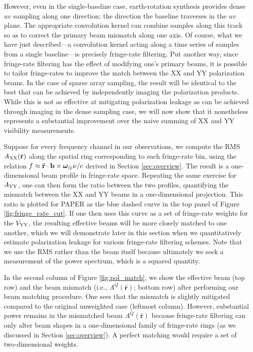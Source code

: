 \documentclass[twocolumn,apj,numberedappendix]{emulateapj}
\newcommand{\rhat}{\hat{\mathbf{r}}}
\begin{document}
However, even in the single-baseline case, earth-rotation synthesis provides dense $uv$ sampling along one direction: the
direction the baseline traverses in the $uv$ plane.  The appropriate
convolution kernel can combine samples along this track so as to correct the primary beam mismatch along one axis.
Of course, what we have just described---a convolution kernel acting along a time series
of samples from a single baseline---is precisely fringe-rate filtering.  Put another way, since fringe-rate filtering has the effect of modifying one's primary beams, it is possible to tailor fringe-rates to improve the match between the XX and YY polarization beams. In the case of sparse array sampling, the result will be identical to the best that can be achieved by independently
imaging the polarization products.  While this is not as effective at mitigating polarization leakage as can be achieved
through imaging in the dense sampling case, we will now show that it nonetheless represents a substantial improvement
over the naive summing of XX and YY visibility measurements.

Suppose for every frequency channel in our observations, we compute the RMS $A_{\rm XX} (\rhat)$ along
the spatial ring corresponding to each fringe-rate bin, using the relation $f \approx \rhat \cdot \mathbf{b}
\times \boldsymbol \omega_\Earth \nu / c$ derived in Section \ref{sec:overview}. The result is
a one-dimensional beam profile in fringe-rate space. Repeating the same exercise for $A_{\rm YY}$,
one can then form the ratio between the two profiles, quantifying the mismatch between the XX and YY
beams in a one-dimensional projection. This ratio is plotted for PAPER as the blue dashed curve in the
top panel of Figure \ref{fig:fringe_rate_cut}. If one then uses this curve as a set of fringe-rate weights
for the ${V_{\rm YY}}$, the resulting effective beams will be more closely matched to one another, which we
will demonstrate later in this section when we quantitatively estimate polarization leakage for various fringe-rate filtering
schemes. Note that
we use the RMS rather than the beam itself because ultimately we seek a measurement
of the power spectrum, which is a squared quantity.

In the second column of Figure \ref{fig:pol_match}, we show the effective beam (top row) and the beam
mismatch (i.e., $A^Q (\rhat)$; bottom row) after performing our beam matching procedure. One sees
that the mismatch is slightly mitigated compared to the original unweighted case (leftmost column).
However, substantial power remains in the mismatched beam $A^Q (\rhat)$ because fringe-rate
filtering can only alter beam shapes in a one-dimensional family of fringe-rate rings (as we discussed in
Section \ref{sec:overview}). A perfect matching would require a set of two-dimensional weights.
\end{document}
